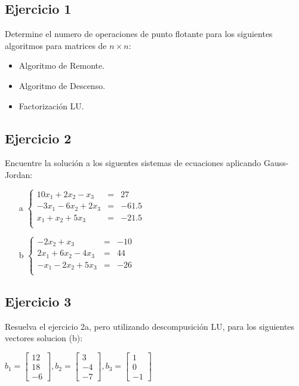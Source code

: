 \documentclass[a4paper,11pt]{article}
\theoremstyle{mytheor}
\begin{document}
\subsection*{Ejercicio 1}
Determine el numero de operaciones de punto flotante para los siguientes algoritmos para matrices de $n\times	n$:
\begin{itemize}
\item Algoritmo de Remonte.
\item Algoritmo de Descenso.
\item Factorización LU.
\end{itemize}

\subsection*{Ejercicio 2}
Encuentre la solución a los siguentes sistemas de ecuaciones aplicando Gauss-Jordan:

\begin{itemize}
\item[a] $\left\lbrace \begin{array}{ccc}
10x_1 +2x_2 -x_3 & = & 27 \\
-3x_1 -6x_2 +2x_3 & = & -61.5 \\
x_1 +x_2 +5x_3 & = & -21.5 \\
\end{array} \right.$ 
\item[b] $\left\lbrace \begin{array}{ccc}
-2x_2 +x_3 & = & -10 \\
2x_1 +6x_2 -4x_3 & = & 44 \\
-x_1 -2x_2 +5x_3 & = & -26 \\
\end{array} \right.$
\end{itemize}


\subsection*{Ejercicio 3}

Resuelva el ejercicio 2a, pero utilizando descompusición LU, para los siguientes vectores solucion (b):

$b_1= \begin{bmatrix}
12\\
18\\
-6
\end{bmatrix},
b_2= \begin{bmatrix}
3\\
-4\\
-7
\end{bmatrix},
b_3= \begin{bmatrix}
1\\
0\\
-1
\end{bmatrix}$
\end{document}
